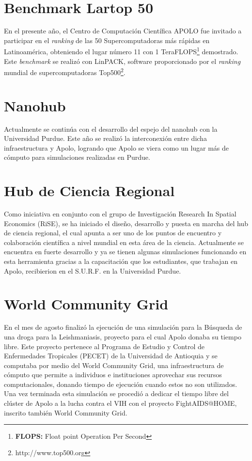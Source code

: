 \section{Benchmark Lartop 50}

En el presente año, el Centro de Computación Científica APOLO fue invitado a participar en el \textit{ranking} de las 50 Supercomputadoras más rápidas en Latinoamérica, obteniendo el lugar número 11 con 1 TeraFLOPS\footnote{\textbf{FLOPS:} Float point Operation Per Second} demostrado. Este \textit{benchmark} se realizó con LinPACK, software proporcionado por el \textit{ranking} mundial de supercomputadoras Top500\footnote{http://www.top500.org}.

\section{Nanohub}
Actualmente se continúa con el desarrollo del espejo del nanohub con la Universidad Purdue. Este año se realizó la interconexión entre dicha infraestructura y Apolo, logrando que Apolo se viera como un lugar más de cómputo para simulaciones realizadas en Purdue.

\section{Hub de Ciencia Regional}
Como iniciativa en conjunto con el grupo de Investigación Research In Spatial Economics (RiSE), se ha iniciado el diseño, desarrollo y puesta en marcha del hub de ciencia regional, el cual apunta a ser uno de los puntos de encuentro y colaboración científica a nivel mundial en esta área de la ciencia. Actualmente se encuentra en fuerte desarrollo y ya se tienen algunas simulaciones funcionando en esta herramienta gracias a la capacitación que los estudiantes, que trabajan en Apolo, recibierion en el S.U.R.F. en la Universidad Purdue.


\section{World Community Grid}

En el mes de agosto finalizó la ejecución de una simulación para la Búsqueda de una droga para la Leishmaniasis, proyecto para el cual Apolo donaba su tiempo libre. Este proyecto pertenece al Programa de Estudio y Control de Enfermedades Tropicales (PECET) de la Universidad de Antioquia y se computaba por medio del World Community Grid, una infraestructura de cómputo que permite a individuos e instituciones aprovechar sus recursos computacionales, donando tiempo de ejecución cuando estos no son utilizados. Una vez terminada esta simulación se procedió a dedicar el tiempo libre del clúster de Apolo a la lucha contra el VIH con el proyecto FightAIDS@HOME, inscrito también World Community Grid.


